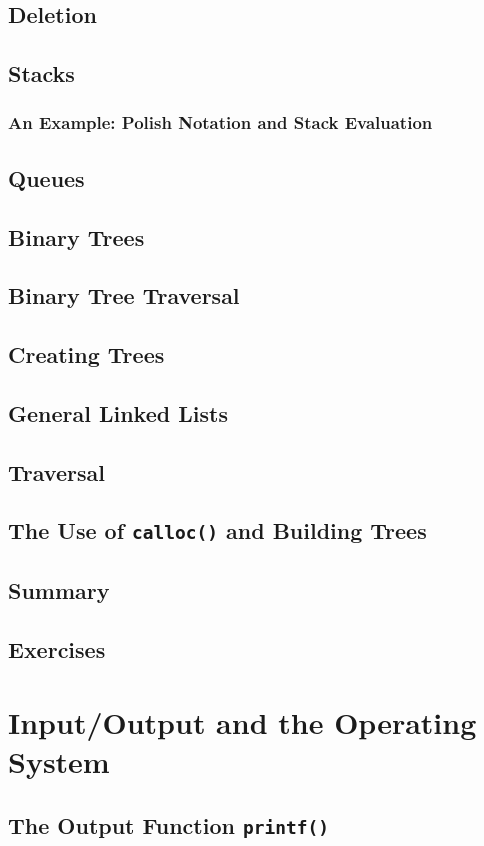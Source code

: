 \documentclass{article}
\begin{document}
\section{Deletion}
\section{Stacks}
\subsection{An Example: Polish Notation and Stack Evaluation}
\section{Queues}
\section{Binary Trees}
\section{Binary Tree Traversal}
\section{Creating Trees}
\section{General Linked Lists}
\section{Traversal}
\section{The Use of \texttt{calloc()} and Building Trees}
\section{Summary}
\section{Exercises}

\chapter{Input/Output and the Operating System}

\section{The Output Function \texttt{printf()}}
\end{document}
